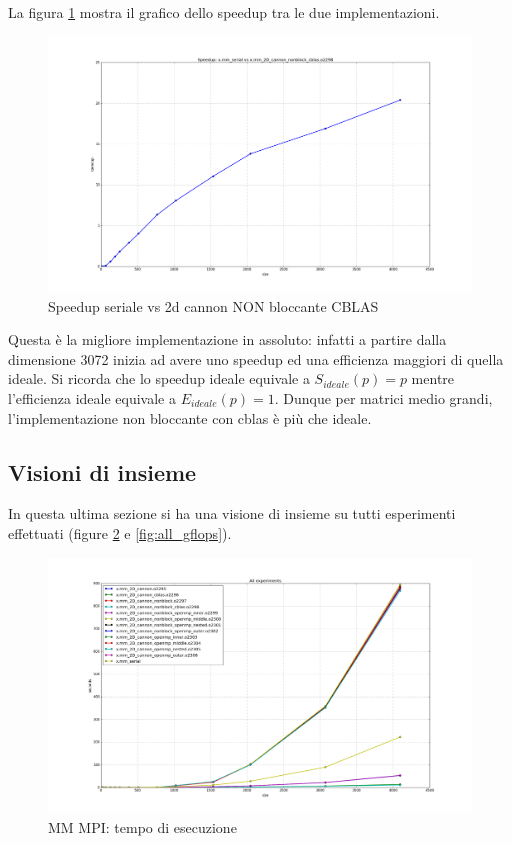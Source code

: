 La figura \ref{fig:speedup_serial_2d_cannon_nonblock_cblas} mostra il grafico dello speedup tra le due implementazioni.

\begin{figure}[htbp]
    \begin{center}
        \includegraphics[width=15cm]{immagini/speedup_serial_2d_cannon_nonblock_cblas.png}
    \end{center}
    \caption{Speedup seriale vs 2d cannon NON bloccante CBLAS}
    \label{fig:speedup_serial_2d_cannon_nonblock_cblas}
\end{figure}

Questa \`{e} la migliore implementazione in assoluto: infatti a partire dalla dimensione 3072 inizia ad avere uno speedup ed una efficienza maggiori di quella ideale.
Si ricorda che lo speedup ideale equivale a $S_{ideale}(p) = p$ mentre l'efficienza ideale equivale a $E_{ideale}(p) = 1$.
Dunque per matrici medio grandi, l'implementazione non bloccante con cblas \`{e} pi\`{u} che ideale.


\subsection{Visioni di insieme}
In questa ultima sezione si ha una visione di insieme su tutti esperimenti effettuati (figure \ref{fig:all_times} e \ref{fig:all_gflops}).

\begin{figure}[htbp]
    \begin{center}
        \includegraphics[width=15cm]{immagini/all_times.png}
    \end{center}
    \caption{MM MPI: tempo di esecuzione}
    \label{fig:all_times}
\end{figure}

